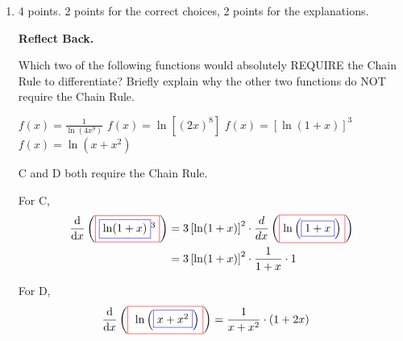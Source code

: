 \documentclass{article}
\newcommand{\outside}[1]{
    \fcolorbox{red}{white}{#1}
}
\newcommand{\inside}[1]{
    \fcolorbox{blue}{white}{#1}
}
\begin{document}
\begin{enumerate}
\begin{enumerate}
  \item
    \begin{problem}[\vfill]
      Does $f$ have an absolute maximum value?  If so, what?  Does
      $f$ have an absolute minimum value?  If so, what?
    \end{problem}

    \begin{solution}
      We can see from our graph that $f$ has an absolute maximum at $x =
      0$, and the absolute maximum value is 1.  $f$ does not have an
      absolute minimum value.
    \end{solution}

  \end{enumerate}

\item 
\begin{grading}
    4 points. 2 points for the correct choices, 2 points for the explanations.
\end{grading}
 \textbf{Reflect Back.}

  \begin{problem}[\vfill]
    Which two of the following functions would absolutely REQUIRE the Chain Rule to differentiate? Briefly explain why the other two functions do NOT require the Chain Rule.
      \begin{enumerate}[label=\protect\maybecircle{\Alph*.},topsep=0pt]
      \plainitem $\displaystyle f(x) =\frac{1}{ \ln(4x^9)}$
      \plainitem $f(x) = \ln [(2x)^8]$
      \circleitem $f(x) = [\ln(1+x)]^3$
      \circleitem $f(x) = \ln(x+x^2)$
      \end{enumerate}
    
  \end{problem}

  \begin{solution}
      C and D both require the Chain Rule.

  For C,
  \begin{align*}
      
  
    \diff*{\left(\outside{$\inside{$\ln(1+x)$}^3$}\right)}{x}
    &= 3\left[\ln(1+x)\right]^2 \cdot \dfrac{d}{dx}\left(\outside{$\ln\left(\inside{$1+x$}\right)$}\right) \\
    &= 3\left[\ln(1+x)\right]^2 \cdot \dfrac{1}{1+x} \cdot 1
  \end{align*}

  For D,
  \begin{align*}
    \diff*{\left(\outside{
    $\ln\left(\inside{$x+x^2$}\right)$}\right)}{x}
    &= \frac{1}{x+x^2}\cdot(1+2x)
  \end{align*}


\end{solution}
\end{enumerate}
\end{document}
